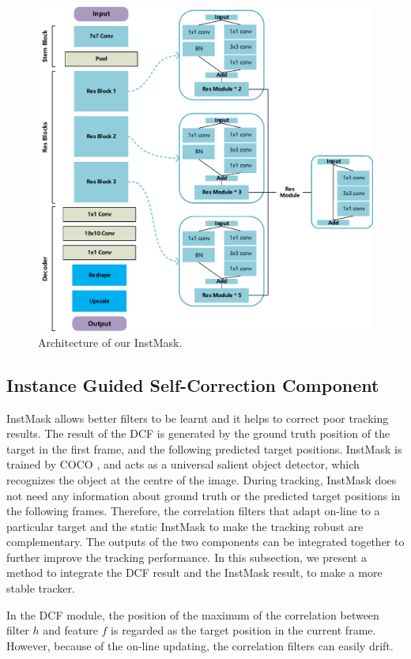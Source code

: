 \documentclass[review]{elsarticle}
\begin{document}
\begin{CJK*}{UTF8}{gbsn}
\begin{figure}
    \centering
    \includegraphics[width=12cm]{images/net.pdf}
    \caption{Architecture of our InstMask.}
    \label{fig:net}
\end{figure}

\subsection{Instance Guided Self-Correction Component} \label{sec:cog}
InstMask allows better filters to be learnt and it helps to correct poor tracking results. The result of the DCF is generated by the ground truth position of the target in the first frame, and the following predicted target positions. InstMask is trained by COCO \cite{Lin2014MicrosoftCC}, and acts as a universal salient object detector, which recognizes the object at the centre of the image. During tracking, InstMask does not need any information about ground truth or the predicted target positions in the following frames. Therefore, the correlation filters that adapt on-line to a particular target and the static InstMask to make the tracking robust are complementary. The outputs of the two components can be integrated together to further improve the tracking performance. In this subsection, we present a method to integrate the DCF result and the InstMask result, to make a more stable tracker.

In the DCF module, the position of the maximum of the correlation between filter $h$ and feature $f$ is regarded as the target position in the current frame. However, because of the on-line updating, the correlation filters can easily drift.


\end{CJK*}
\end{document}
